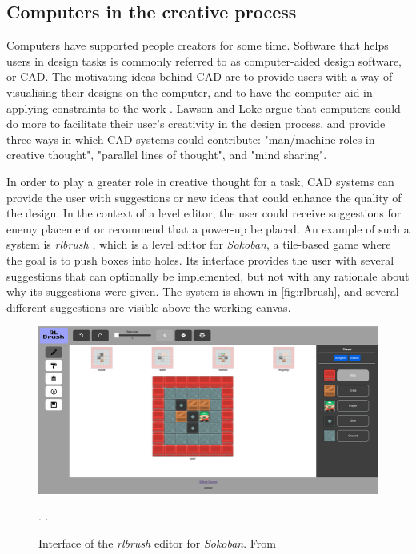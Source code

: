 \subsection{Computers in the creative process}

Computers have supported people creators for some time. Software that helps users in design
tasks is commonly referred to as computer-aided design software, or CAD. The motivating
ideas behind CAD are to provide users with a way of visualising their designs on the
computer, and to have the computer aid in applying constraints to the work
\cite{lawson1997}. Lawson and Loke argue that computers could do more to facilitate their
user's creativity in the design process, and provide three ways in which CAD systems could
contribute: "man/machine roles in creative thought", "parallel lines of thought", and "mind
sharing".

In order to play a greater role in creative thought for a task, CAD systems can provide the
user with suggestions or new ideas that could enhance the quality of the design. In the
context of a level editor, the user could receive suggestions for enemy placement or
recommend that a power-up be placed. An example of such a system is \emph{rlbrush} \cite{delarosa2021},
which is a level editor for \emph{Sokoban}, a tile-based game where the goal is to push
boxes into holes. Its interface provides the user with several suggestions that can
optionally be implemented, but not with any rationale about why its suggestions were given.
The system is shown in \autoref{fig:rlbrush}, and several different suggestions are visible
above the working canvas.

\begin{figure}[ht]
    \centering
    \includegraphics[width=\linewidth]{img/fig8-rlbrush.png}
    \caption{Interface of the \emph{rlbrush} editor for \emph{Sokoban}. From \cite{delarosa2021}}.
    \label{fig:rlbrush}.
\end{figure}


